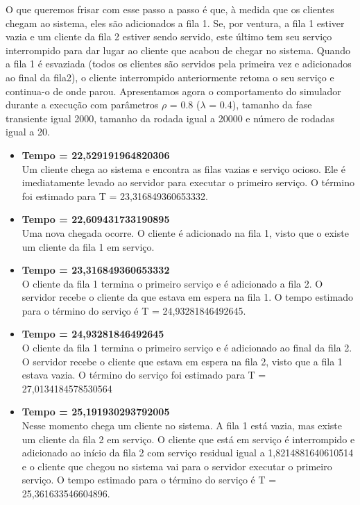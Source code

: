 \documentclass[a4paper,10pt]{article}
\begin{document}
      O que queremos frisar com esse passo a passo é que, à medida que os clientes chegam ao sistema, eles são adicionados a fila 1. Se, por ventura, a fila 1 estiver vazia e um cliente da fila 2 estiver sendo servido, 
      este último tem seu serviço interrompido para dar lugar ao cliente que acabou de chegar no sistema. Quando a fila 1 é esvaziada (todos os clientes são servidos pela primeira vez e adicionados ao final da fila2), 
      o cliente interrompido anteriormente retoma o seu serviço e continua-o de onde parou. Apresentamos agora o comportamento do simulador durante a execução com parâmetros $\rho$ = 0.8 ($\lambda$ = 0.4), tamanho da fase transiente 
      igual 2000, tamanho da rodada igual a 20000 e número de rodadas igual a 20.
      \begin{itemize}
	  \item \textbf{Tempo = 22,529191964820306\\}
	  Um cliente chega ao sistema e encontra as filas vazias e serviço ocioso. Ele é imediatamente levado ao servidor para executar o primeiro serviço. O término foi estimado para T = 23,316849360653332.
	  \item \textbf{Tempo = 22,609431733190895\\}
	  Uma nova chegada ocorre. O cliente é adicionado na fila 1, visto que o existe um cliente da fila 1 em serviço.
	  \item \textbf{Tempo = 23,316849360653332\\}
	  O cliente da fila 1 termina o primeiro serviço e é adicionado a fila 2. O servidor recebe o cliente da que estava em espera na fila 1. O tempo estimado para o término do serviço é T = 24,93281846492645.
	  \item \textbf{Tempo = 24,93281846492645\\}
	  O cliente da fila 1 termina o primeiro serviço e é adicionado ao final da fila 2. O servidor recebe o cliente que estava em espera na fila 2, visto que a fila 1 estava vazia. O término do serviço foi estimado para T = 27,0134184578530564
	  \item \textbf{Tempo = 25,191930293792005\\}
	  Nesse momento chega um cliente no sistema. A fila 1 está vazia, mas existe um cliente da fila 2 em serviço. O cliente que está em serviço é interrompido e adicionado ao início da fila 2 com serviço residual igual a 1,8214881640610514
	  e o cliente que chegou no sistema vai para o servidor executar o primeiro serviço. O tempo estimado para o término do serviço é T = 25,361633546604896.

\end{itemize}
\end{document}
